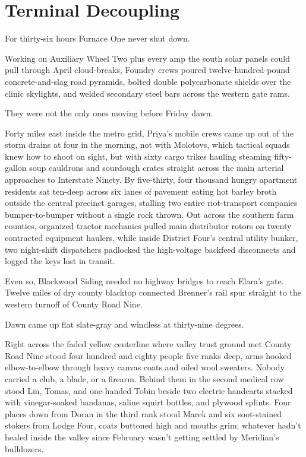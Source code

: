 \chapter{Terminal Decoupling}

For thirty-six hours Furnace One never shut down.

Working on Auxiliary Wheel Two plus every amp the south solar panels could pull through April cloud-breaks, Foundry crews poured twelve-hundred-pound concrete-and-slag road pyramids, bolted double polycarbonate shields over the clinic skylights, and welded secondary steel bars across the western gate rams.

They were not the only ones moving before Friday dawn.

Forty miles east inside the metro grid, Priya's mobile crews came up out of the storm drains at four in the morning, not with Molotovs, which tactical squads knew how to shoot on sight, but with sixty cargo trikes hauling steaming fifty-gallon soup cauldrons and sourdough crates straight across the main arterial approaches to Interstate Ninety. By five-thirty, four thousand hungry apartment residents sat ten-deep across six lanes of pavement eating hot barley broth outside the central precinct garages, stalling two entire riot-transport companies bumper-to-bumper without a single rock thrown. Out across the southern farm counties, organized tractor mechanics pulled main distributor rotors on twenty contracted equipment haulers, while inside District Four's central utility bunker, two night-shift dispatchers padlocked the high-voltage backfeed disconnects and logged the keys lost in transit.

Even so, Blackwood Siding needed no highway bridges to reach Elara's gate. Twelve miles of dry county blacktop connected Brenner's rail spur straight to the western turnoff of County Road Nine.

Dawn came up flat slate-gray and windless at thirty-nine degrees.

Right across the faded yellow centerline where valley trust ground met County Road Nine stood four hundred and eighty people five ranks deep, arms hooked elbow-to-elbow through heavy canvas coats and oiled wool sweaters. Nobody carried a club, a blade, or a firearm. Behind them in the second medical row stood Lin, Tomas, and one-handed Tobin beside two electric handcarts stacked with vinegar-soaked bandanas, saline squirt bottles, and plywood splints. Four places down from Doran in the third rank stood Marek and six soot-stained stokers from Lodge Four, coats buttoned high and mouths grim; whatever hadn't healed inside the valley since February wasn't getting settled by Meridian's bulldozers.

